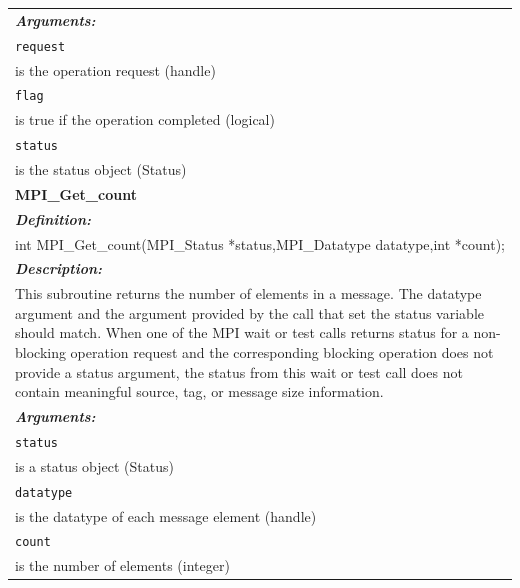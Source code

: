 \begin{longtable}{|p{5.5in}|}
\emph{\bfseries{Arguments: }} \\
\lstinline$request$\\
\hspace{0.5cm}     is the operation request (handle)\\
\lstinline$flag$\\
\hspace{0.5cm}     is true if the operation completed (logical)\\
\lstinline$status$\\
\hspace{0.5cm}    is the status object (Status)\\

\hline

\vspace{-0.8cm}

\LARGE{\bfseries{MPI\_Get\_count}} \\

\vspace{-0.3cm}

\emph{\bfseries{Definition: }} \\
int MPI\_Get\_count(MPI\_Status *status,MPI\_Datatype datatype,int *count); \\
\vspace{-0.3cm}

\emph{\bfseries{Description: }} \\
This subroutine returns the number of elements in a message. The datatype argument and the argument provided by the call that set the status variable should match. When one of the MPI wait or test calls returns status for a non-blocking operation request and the corresponding blocking operation does not provide a status argument, the status from this wait or test call does not contain meaningful source, tag, or message size information. \\
\vspace{-0.3cm}

\emph{\bfseries{Arguments: }} \\
\lstinline$status$\\
\hspace{0.5cm}     is a status object (Status)\\
\lstinline$datatype$\\
\hspace{0.5cm}     is the datatype of each message element (handle)\\
\lstinline$count$\\
\hspace{0.5cm}     is the number of elements (integer)\\


\end{longtable}
